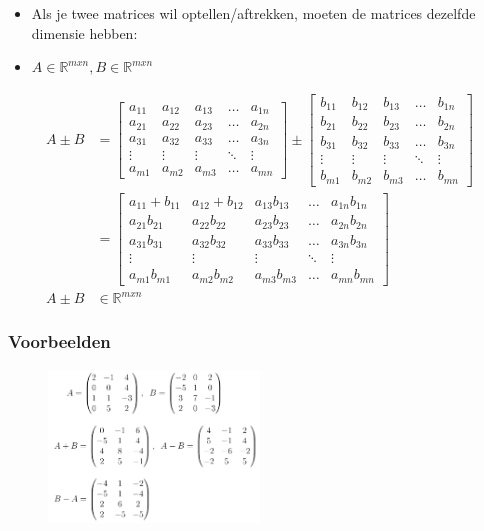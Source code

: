 \documentclass{article}
\begin{document}
\begin{itemize}
    \item Als je twee matrices wil optellen/aftrekken, moeten de matrices dezelfde dimensie hebben:
    \item $A \in \mathbb{R}^{mxn}, B \in \mathbb{R}^{mxn}$
\end{itemize}

\begin{align*}
    A \pm B & = 
\begin{bmatrix}
    a_{11} & a_{12} & a_{13} & \dots & a_{1n}\\
    a_{21} & a_{22} & a_{23} & \dots & a_{2n}\\
    a_{31} & a_{32} & a_{33} & \dots & a_{3n}\\
    \vdots & \vdots & \vdots & \ddots & \vdots\\
    a_{m1} & a_{m2} & a_{m3} & \dots & a_{mn}
\end{bmatrix} \pm 
\begin{bmatrix}
    b_{11} & b_{12} & b_{13} & \dots & b_{1n}\\
    b_{21} & b_{22} & b_{23} & \dots & b_{2n}\\
    b_{31} & b_{32} & b_{33} & \dots & b_{3n}\\
    \vdots & \vdots & \vdots & \ddots & \vdots\\
    b_{m1} & b_{m2} & b_{m3} & \dots & b_{mn}
\end{bmatrix} \\
& = \begin{bmatrix}
    a_{11}+b_{11} & a_{12}+b_{12} & a_{13}b_{13} & \dots & a_{1n}b_{1n}\\
    a_{21}b_{21} & a_{22}b_{22} & a_{23}b_{23} & \dots & a_{2n}b_{2n}\\
    a_{31}b_{31} & a_{32}b_{32} & a_{33}b_{33} & \dots & a_{3n}b_{3n}\\
    \vdots & \vdots & \vdots & \ddots & \vdots\\
    a_{m1}b_{m1} & a_{m2}b_{m2} & a_{m3}b_{m3} & \dots & a_{mn}b_{mn}
\end{bmatrix}\\
A \pm B & \in \mathbb{R}^{mxn}
\end{align*}

\subsubsection{Voorbeelden}

\begin{figure}[H]
    \centering
    \includegraphics[width=0.5\textwidth]{matrix-somverschil-voorbeelden.png}
\end{figure}
\end{document}
